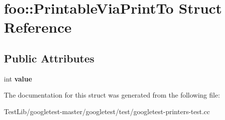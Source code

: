 \hypertarget{structfoo_1_1PrintableViaPrintTo}{}\section{foo\+:\+:Printable\+Via\+Print\+To Struct Reference}
\label{structfoo_1_1PrintableViaPrintTo}
\subsection*{Public Attributes}
\begin{DoxyCompactItemize}
\item 
\mbox{\label{structfoo_1_1PrintableViaPrintTo_a16f8c6420275d86f0d0112ca5a41bca2}} 
int {\bfseries value}
\end{DoxyCompactItemize}


The documentation for this struct was generated from the following file\+:\begin{DoxyCompactItemize}
\item 
Test\+Lib/googletest-\/master/googletest/test/googletest-\/printers-\/test.\+cc\end{DoxyCompactItemize}
